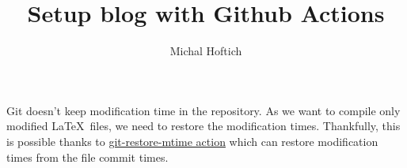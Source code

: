 \documentclass{article}
\title{Setup blog with Github Actions}
\author{Michal Hoftich}
\begin{document}
\maketitle

Git doesn't keep modification time in the repository. As we want to compile only modified
\LaTeX\ files, we need to restore the modification times. 
Thankfully, this is possible thanks to 
\href{https://github.com/chetan/git-restore-mtime-action}{git-restore-mtime action}
which can restore modification times from the file commit times.

\begin{verbatim}
\end{verbatim}
\end{document}
